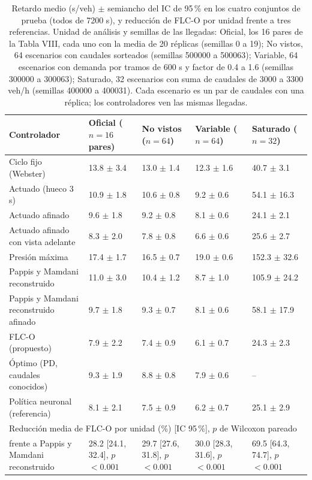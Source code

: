 \begin{table}[!t]
\centering
\caption{Retardo medio (s/veh) $\pm$ semiancho del IC de 95\,\% en los cuatro conjuntos de prueba (todos de 7200 s), y reducci\'on de FLC-O por unidad frente a tres referencias. Unidad de an\'alisis y semillas de las llegadas: Oficial, los 16 pares de la Tabla VIII, cada uno con la media de 20 r\'eplicas (semillas 0 a 19); No vistos, 64 escenarios con caudales sorteados (semillas 500000 a 500063); Variable, 64 escenarios con demanda por tramos de 600 s y factor de 0.4 a 1.6 (semillas 300000 a 300063); Saturado, 32 escenarios con suma de caudales de 3000 a 3300 veh/h (semillas 400000 a 400031). Cada escenario es un par de caudales con una r\'eplica; los controladores ven las mismas llegadas.}
\label{tab:conjuntos}
\scriptsize
\setlength{\tabcolsep}{3pt}
\begin{tabular}{@{}lllll@{}}
\toprule
Controlador & Oficial ($n=16$ pares) & No vistos ($n=64$) & Variable ($n=64$) & Saturado ($n=32$) \\
\midrule
Ciclo fijo (Webster) & 13.8 $\pm$ 3.4 & 13.0 $\pm$ 1.4 & 12.3 $\pm$ 1.6 & 40.7 $\pm$ 3.1 \\
Actuado (hueco 3 s) & 10.9 $\pm$ 1.8 & 10.6 $\pm$ 0.8 & 9.2 $\pm$ 0.6 & 54.1 $\pm$ 16.3 \\
Actuado afinado & 9.6 $\pm$ 1.8 & 9.2 $\pm$ 0.8 & 8.1 $\pm$ 0.6 & 24.1 $\pm$ 2.1 \\
Actuado afinado con vista adelante & 8.3 $\pm$ 2.0 & 7.8 $\pm$ 0.8 & 6.6 $\pm$ 0.6 & 25.6 $\pm$ 2.7 \\
Presión máxima & 17.4 $\pm$ 1.7 & 16.5 $\pm$ 0.7 & 19.0 $\pm$ 0.6 & 152.3 $\pm$ 32.6 \\
Pappis y Mamdani reconstruido & 11.0 $\pm$ 3.0 & 10.4 $\pm$ 1.2 & 8.7 $\pm$ 1.0 & 105.9 $\pm$ 24.2 \\
Pappis y Mamdani reconstruido afinado & 9.7 $\pm$ 1.8 & 9.3 $\pm$ 0.7 & 8.1 $\pm$ 0.6 & 58.1 $\pm$ 17.9 \\
FLC-O (propuesto) & 7.9 $\pm$ 2.2 & 7.4 $\pm$ 0.9 & 6.1 $\pm$ 0.7 & 24.3 $\pm$ 2.3 \\
Óptimo (PD, caudales conocidos) & 9.3 $\pm$ 1.9 & 8.8 $\pm$ 0.8 & 7.9 $\pm$ 0.6 & -- \\
Política neuronal (referencia) & 8.1 $\pm$ 2.1 & 7.5 $\pm$ 0.9 & 6.2 $\pm$ 0.7 & 25.1 $\pm$ 2.9 \\
\midrule
\multicolumn{5}{l}{Reducci\'on media de FLC-O por unidad (\%) [IC 95\,\%], $p$ de Wilcoxon pareado} \\
\quad frente a Pappis y Mamdani reconstruido & 28.2 [24.1, 32.4], $p$ $<\!0.001$ & 29.7 [27.6, 31.8], $p$ $<\!0.001$ & 30.0 [28.3, 31.6], $p$ $<\!0.001$ & 69.5 [64.3, 74.7], $p$ $<\!0.001$ \\

\end{tabular}
\end{table}
